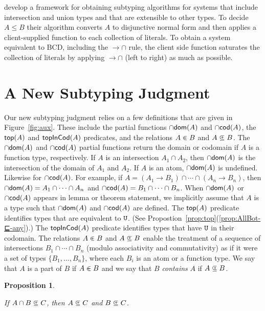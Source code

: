 \documentclass{article}
\newtheorem{proposition}[theorem]{Proposition}
\begin{document}
\citet{Muehlboeck:2018aa} develop a framework for obtaining subtyping
algorithms for systems that include intersection and union types and
that are extensible to other types. To decide $A \leq B$ their
algorithm converts $A$ to disjunctive normal form and then applies a
client-supplied function to each collection of literals. To obtain a
system equivalent to BCD, including the ${\to}{\cap}$ rule, the client
side function saturates the collection of literals by applying
${\to}{\cap}$ (left to right) as much as possible.

\section{A New Subtyping Judgment}
\label{sec:new-subtyping}

Our new subtyping judgment relies on a few definitions that are given
in Figure~\ref{fig:aux}. These include the partial functions $\cap\mathsf{dom}(A)$
and $\cap\mathsf{cod}(A)$, the $\mathsf{top}(A)$ and $\mathsf{topInCod}(A)$ predicates, and the
relations $A \inplus B$ and $A \subsetpluseq B$.
%
The $\cap\mathsf{dom}(A)$ and $\cap\mathsf{cod}(A)$ partial functions return the domain or
codomain if $A$ is a function type, respectively. If $A$ is an
intersection $A_1 \cap A_2$, then $\cap\mathsf{dom}(A)$ is the intersection of the
domain of $A_1$ and $A_2$.  If $A$ is an atom, $\cap\mathsf{dom}(A)$ is
undefined. Likewise for $\cap\mathsf{cod}(A)$. For example, if $A = (A_1 \to B_1)
\cap \cdots \cap (A_n \to B_n)$, then $\cap\mathsf{dom}(A) = A_1 \cap \cdots \cap
A_n$ and $\cap\mathsf{cod}(A) = B_1 \cap \cdots \cap B_n$.  When $\cap\mathsf{dom}(A)$ or
$\cap\mathsf{cod}(A)$ appears in lemma or theorem statement, we implicitly assume
that $A$ is a type such that $\cap\mathsf{dom}(A)$ and $\cap\mathsf{cod}(A)$ are defined.
%
The $\mathsf{top}(A)$ predicate identifies types that are equivalent to
$\mathtt{U}$. (See Propostion~\ref{prop:top}(\ref{prop:AllBot-⊑-any}).) The
$\mathsf{topInCod}(A)$ predicate identifies types that have $\mathtt{U}$ in their
codomain.
%
The relations $A \inplus B$ and $A \subsetpluseq B$ enable the
treatment of a sequence of intersections $B_1 \cap \cdots \cap B_n$
(modulo associativity and commutativity) as if it were a set of types
$\{ B_1, \ldots, B_n \}$, where each $B_i$ is an atom or a function
type.  We say that $A$ is a part of $B$ if $A \inplus B$ and we say
that $B$ \emph{contains} $A$ if $A \subsetpluseq B$.

\begin{proposition}\label{prop:union-subset-inv}
 \item If $A \cap B \subsetpluseq C$, then $A \subsetpluseq C$ and $B \subsetpluseq C$. 
\end{proposition}
\end{document}
